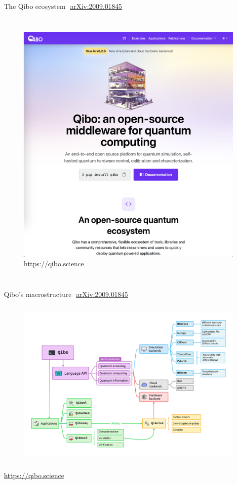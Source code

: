 \documentclass[aspectratio=169, 10pt, xcolor={svgnames}, hyperref={linkcolor=black}]{beamer}
\begin{document}
\begin{frame}{The Qibo ecosystem\hfill \faBook\,\, \href{https://arxiv.org/abs/2009.01845}{arXiv:2009.01845}}
\begin{columns}
     \column{5cm}
     \begin{figure}
       \includegraphics[width=\textwidth]{figures/docs.png}
       {\color{blue}\url{https://qibo.science}}
     \end{figure}
   \end{columns}
\end{frame}

 \begin{frame}{Qibo's macrostructure\hfill \faBook\,\, \href{https://arxiv.org/abs/2009.01845}{arXiv:2009.01845}}
   \vspace{-0.27cm}
   \begin{figure}
     \includegraphics[height=8.3cm]{figures/qibo_ecosystem.pdf}
   \end{figure}
   \vspace{-1.3cm}
   \hfill{\footnotesize \color{blue}\url{https://qibo.science}}
 \end{frame}
\end{document}
